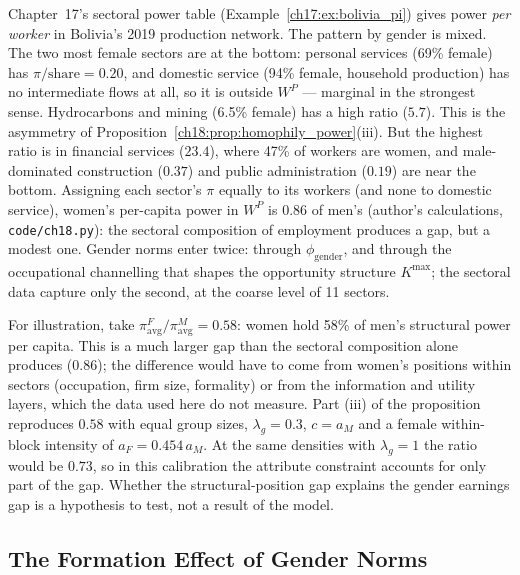 \documentclass[../structural_economics_book.tex]{subfiles}
\begin{document}
\begin{example}
Chapter~17's sectoral power table (Example~\ref{ch17:ex:bolivia_pi}) gives power \emph{per worker} in Bolivia's 2019 production network. The pattern by gender is mixed. The two most female sectors are at the bottom: personal services (69\% female) has $\pi/\text{share} = 0.20$, and domestic service (94\% female, household production) has no intermediate flows at all, so it is outside $W^P$ --- marginal in the strongest sense. Hydrocarbons and mining (6.5\% female) has a high ratio ($5.7$). This is the asymmetry of Proposition~\ref{ch18:prop:homophily_power}(iii). But the highest ratio is in financial services ($23.4$), where 47\% of workers are women, and male-dominated construction ($0.37$) and public administration ($0.19$) are near the bottom. Assigning each sector's $\pi$ equally to its workers (and none to domestic service), women's per-capita power in $W^P$ is $0.86$ of men's (author's calculations, \texttt{code/ch18.py}): the sectoral composition of employment produces a gap, but a modest one. Gender norms enter twice: through $\phi_{\text{gender}}$, and through the occupational channelling that shapes the opportunity structure $K^{\max}$; the sectoral data capture only the second, at the coarse level of 11 sectors.

For illustration, take $\pi^F_{\text{avg}} / \pi^M_{\text{avg}} = 0.58$: women hold 58\% of men's structural power per capita. This is a much larger gap than the sectoral composition alone produces ($0.86$); the difference would have to come from women's positions within sectors (occupation, firm size, formality) or from the information and utility layers, which the data used here do not measure. Part (iii) of the proposition reproduces $0.58$ with equal group sizes, $\lambda_g = 0.3$, $c = a_M$ and a female within-block intensity of $a_F = 0.454\,a_M$. At the same densities with $\lambda_g = 1$ the ratio would be $0.73$, so in this calibration the attribute constraint accounts for only part of the gap. Whether the structural-position gap explains the gender earnings gap is a hypothesis to test, not a result of the model.
\end{example}

\subsection{The Formation Effect of Gender Norms}
\end{document}
